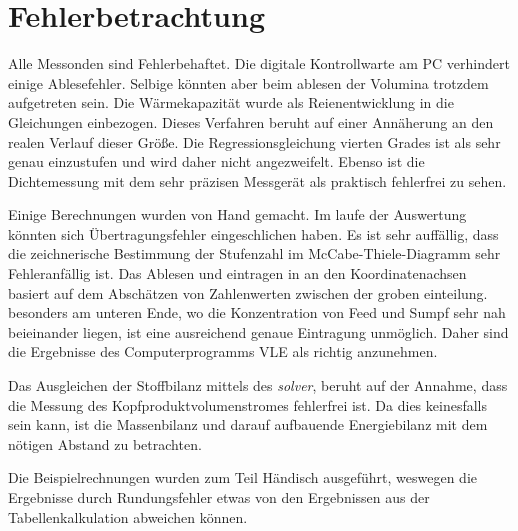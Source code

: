 \section{Fehlerbetrachtung}
\label{sec:fehler}

Alle Messonden sind Fehlerbehaftet. Die digitale Kontrollwarte am PC verhindert einige Ablesefehler. Selbige könnten aber beim ablesen der Volumina trotzdem aufgetreten sein. Die Wärmekapazität wurde als Reienentwicklung in die Gleichungen einbezogen. Dieses Verfahren beruht auf einer Annäherung an den realen Verlauf dieser Größe. Die Regressionsgleichung vierten Grades ist als sehr genau einzustufen und wird daher nicht angezweifelt. Ebenso ist die Dichtemessung mit dem sehr präzisen Messgerät als praktisch fehlerfrei zu sehen.

Einige Berechnungen wurden von Hand gemacht. Im laufe der Auswertung könnten sich Übertragungsfehler eingeschlichen haben. Es ist sehr auffällig, dass die zeichnerische Bestimmung der Stufenzahl im McCabe-Thiele-Diagramm sehr Fehleranfällig ist. Das Ablesen und eintragen in an den Koordinatenachsen basiert auf dem Abschätzen von Zahlenwerten zwischen der groben einteilung. besonders am unteren Ende, wo die Konzentration von Feed und Sumpf sehr nah beieinander liegen, ist eine ausreichend genaue Eintragung unmöglich. Daher sind die Ergebnisse des Computerprogramms VLE als richtig anzunehmen.


Das Ausgleichen der Stoffbilanz mittels des \emph{solver}, beruht auf der Annahme, dass die Messung des Kopfproduktvolumenstromes fehlerfrei ist. Da dies keinesfalls sein kann, ist die Massenbilanz und darauf aufbauende Energiebilanz mit dem nötigen Abstand zu betrachten.

Die Beispielrechnungen wurden zum Teil Händisch ausgeführt, weswegen die Ergebnisse durch Rundungsfehler etwas von den Ergebnissen aus der Tabellenkalkulation abweichen können.